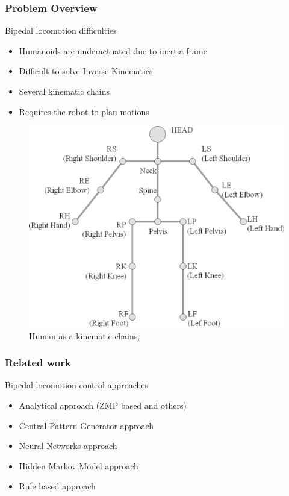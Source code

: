 \documentclass{beamer}
\begin{document}
\begin{frame}
	\frametitle{Problem Overview}
	\begin{block}{Bipedal locomotion difficulties}
		\begin{itemize}
			\item
				Humanoids are underactuated due to inertia frame
			\item
				Difficult to solve Inverse Kinematics
			\item
				Several kinematic chains
			\item 
				Requires the robot to plan motions
		\end{itemize}
	\end{block}
	
	\begin{figure}[h!]
		\begin{minipage}[H]{\linewidth}
			\centering
			\includegraphics[scale=0.5]{presentation_images/7}
			\caption{Human as a kinematic chains, \cite{seo2011improved}}
		\end{minipage}
	\end{figure}
\end{frame}


	\begin{frame}
		\frametitle{Related work}
		\begin{block}{Bipedal locomotion control approaches}
			\begin{itemize}
				\item
					Analytical approach (ZMP based and others)
				\item
					Central Pattern Generator approach
				\item
					Neural Networks approach
				\item 
					Hidden Markov Model approach
				\item
					Rule based approach
			\end{itemize}
		\end{block}
	\end{frame}
\end{document}
